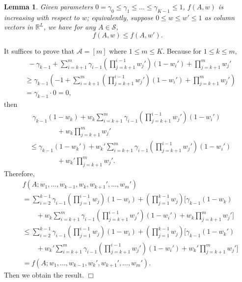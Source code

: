 \documentclass{article}
\newcommand{\RR}{\mathbb{R}}
\newcommand{\cA}{\mathcal{A}}
\newcommand{\cS}{\mathcal{S}}
\newtheorem{lemma}[theorem]{Lemma}%
\newenvironment{proof}{\noindent {\textbf{Proof. }}}{$\Box$ \medskip}
\begin{document}
\begin{lemma}
\label{lem:increasing} 
Given parameters $0= \gamma_0 \leq \gamma_1 \leq ... \leq \gamma_{K-1} \leq 1$, $f(A, w)$ is increasing with respect to $w$; equivalently, suppose $0 \leq w \leq w' \leq 1$ as column vectors in $\RR^L$, we have for any $A\in\cS$,
$$
f(A, w) \leq f(A, w').
$$
\end{lemma}
\begin{proof}
It suffices to prove that $\cA = [m]$ where $1 \leq m \leq K$. Because for $1 \leq k \leq m$,
\begin{align*}
&~~-\gamma_{k-1} + \sum_{i=k+1}^m \gamma_{i-1}(\prod_{j=k+1}^{i-1}w_j')(1- w_i') + \prod_{j=k+1}^{m}w_j'\\
&\geq \gamma_{k-1} (-1 + \sum_{i=k+1}^m (\prod_{j=k+1}^{i-1}w_j')(1- w_i') +  \prod_{j=k+1}^{m}w_j')\\
&=\gamma_{k-1} \cdot 0 = 0,
\end{align*}
then
\begin{align*}
&~~\gamma_{k-1} (1 - w_k) + w_k\sum_{i=k+1}^m \gamma_{i-1}(\prod_{j=k+1}^{i-1}w_j')(1- w_i')\\
&\qquad \qquad + w_k\prod_{j=k+1}^{m}w_j'\\
& \leq \gamma_{k-1} (1 - w_k') + w_k'\sum_{i=k+1}^m \gamma_{i-1}(\prod_{j=k+1}^{i-1}w_j')(1- w_i')\\
&\qquad \qquad + w_k'\prod_{j=k+1}^{m}w_j'.
\end{align*}
Therefore, 
\begin{align*}
& f(A; w_1,...,w_{k-1},w_k,w_{k+1}',...,w_m')\\
&=\sum_{i=2}^{k-1} \gamma_{i-1} (\prod_{j=1}^{i-1}w_j)(1 - w_i) + (\prod_{j=1}^{k-1}w_j) [\gamma_{k-1} (1 - w_k) \\
&\qquad + w_k\sum_{i=k+1}^m \gamma_{i-1}(\prod_{j=k+1}^{i-1}w_j')(1- w_i') + w_k\prod_{j=k+1}^{m}w_j']\\
&\leq \sum_{i=2}^{k-1} \gamma_{i-1} (\prod_{j=1}^{i-1}w_j) (1 - w_i) + (\prod_{j=1}^{k-1}w_j) [\gamma_{k-1} (1 - w_k') \\
&\qquad + w_k'\sum_{i=k+1}^m \gamma_{i-1} (\prod_{j=k+1}^{i-1}w_j')(1- w_i') + w_k'\prod_{j=k+1}^{m}w_j']\\
&=f(A; w_1,...,w_{k-1},w_{k}',w_{k+1}',...,w_m').
\end{align*}
Then we obtain the result.
\end{proof}
\end{document}
